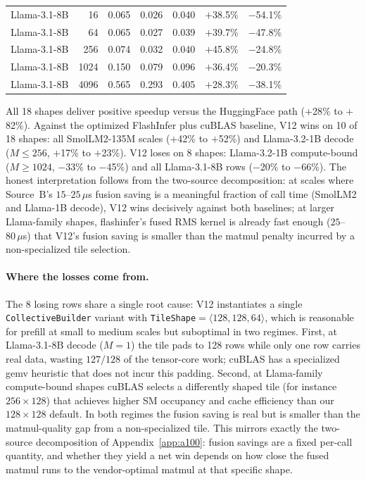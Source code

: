 \documentclass{article}
\begin{document}
\begin{table}[h!]
\begin{tabular}{l r r r r r r}
Llama-3.1-8B & 16   & 0.065 & 0.026 & 0.040 & $+$38.5\% & $-$54.1\% \\
Llama-3.1-8B & 64   & 0.065 & 0.027 & 0.039 & $+$39.7\% & $-$47.8\% \\
Llama-3.1-8B & 256  & 0.074 & 0.032 & 0.040 & $+$45.8\% & $-$24.8\% \\
Llama-3.1-8B & 1024 & 0.150 & 0.079 & 0.096 & $+$36.4\% & $-$20.3\% \\
Llama-3.1-8B & 4096 & 0.565 & 0.293 & 0.405 & $+$28.3\% & $-$38.1\% \\
\hline
\end{tabular}
\end{table}

All 18 shapes deliver positive speedup versus the HuggingFace path ($+$28\% to $+$82\%). Against the optimized FlashInfer plus cuBLAS baseline, V12 wins on 10 of 18 shapes: all SmolLM2-135M scales ($+$42\% to $+$52\%) and Llama-3.2-1B decode ($M \leq 256$, $+$17\% to $+$23\%). V12 loses on 8 shapes: Llama-3.2-1B compute-bound ($M \geq 1024$, $-$33\% to $-$45\%) and all Llama-3.1-8B rows ($-$20\% to $-$66\%). The honest interpretation follows from the two-source decomposition: at scales where Source~B's $15$--$25\,\mu$s fusion saving is a meaningful fraction of call time (SmolLM2 and Llama-1B decode), V12 wins decisively against both baselines; at larger Llama-family shapes, flashinfer's fused RMS kernel is already fast enough ($25$--$80\,\mu$s) that V12's fusion saving is smaller than the matmul penalty incurred by a non-specialized tile selection.

\paragraph{Where the losses come from.} The 8 losing rows share a single root cause: V12 instantiates a single \texttt{CollectiveBuilder} variant with \texttt{TileShape}$=\langle 128, 128, 64 \rangle$, which is reasonable for prefill at small to medium scales but suboptimal in two regimes. First, at Llama-3.1-8B decode ($M{=}1$) the tile pads to 128 rows while only one row carries real data, wasting $127/128$ of the tensor-core work; cuBLAS has a specialized gemv heuristic that does not incur this padding. Second, at Llama-family compute-bound shapes cuBLAS selects a differently shaped tile (for instance $256{\times}128$) that achieves higher SM occupancy and cache efficiency than our $128{\times}128$ default. In both regimes the fusion saving is real but is smaller than the matmul-quality gap from a non-specialized tile. This mirrors exactly the two-source decomposition of Appendix~\ref{app:a100}: fusion savings are a fixed per-call quantity, and whether they yield a net win depends on how close the fused matmul runs to the vendor-optimal matmul at that specific shape.
\end{document}
